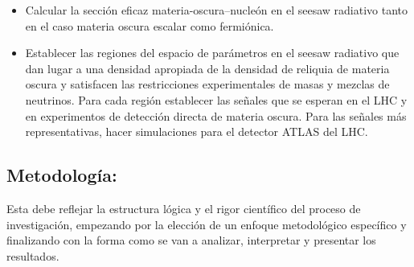 \begin{itemize}
\item 
\begin{darkmatter}
  Calcular la sección eficaz materia-oscura--nucleón en el seesaw
  radiativo tanto en el caso materia oscura escalar como fermiónica.
\end{darkmatter}

\item 
\begin{darkmatter}
  Establecer las regiones del espacio de parámetros en el seesaw
  radiativo que dan lugar a una densidad apropiada de la densidad de
  reliquia de materia oscura y satisfacen las restricciones
  experimentales de masas y mezclas de neutrinos. Para cada región
  establecer las señales que se esperan en el LHC y en experimentos de
  detección directa de materia oscura.  Para las señales más
  representativas, hacer simulaciones para el detector ATLAS del LHC.
\end{darkmatter}




\end{itemize}

\subsection{Metodología:                                   }
\begin{instrucciones}
  Esta debe reflejar la estructura lógica y el rigor científico del
  proceso de investigación, empezando por la elección de un enfoque
  metodológico específico y finalizando con la forma como se van a
  analizar, interpretar y presentar los resultados.
\end{instrucciones}

